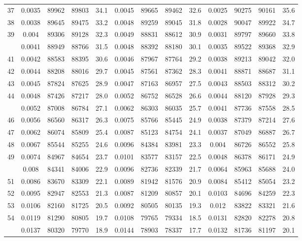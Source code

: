 \documentclass[
  14pt,
]{article}
\begin{document}
\begin{longtable}[t]{lcccccccccccc}
37 & 0.0035 & 89962 & 89803 & 34.1 & 0.0045 & 89665 & 89462 & 32.6 & 0.0025 & 90275 & 90161 & 35.6\\
38 & 0.0038 & 89645 & 89475 & 33.2 & 0.0048 & 89259 & 89045 & 31.8 & 0.0028 & 90047 & 89922 & 34.7\\
39 & 0.004 & 89306 & 89128 & 32.3 & 0.0049 & 88831 & 88612 & 30.9 & 0.0031 & 89797 & 89660 & 33.8\\
\addlinespace
40 & 0.0041 & 88949 & 88766 & 31.5 & 0.0048 & 88392 & 88180 & 30.1 & 0.0035 & 89522 & 89368 & 32.9\\
41 & 0.0042 & 88583 & 88395 & 30.6 & 0.0046 & 87967 & 87764 & 29.2 & 0.0038 & 89213 & 89042 & 32.0\\
42 & 0.0044 & 88208 & 88016 & 29.7 & 0.0045 & 87561 & 87362 & 28.3 & 0.0041 & 88871 & 88687 & 31.1\\
43 & 0.0045 & 87824 & 87625 & 28.9 & 0.0047 & 87163 & 86957 & 27.5 & 0.0043 & 88503 & 88312 & 30.2\\
44 & 0.0048 & 87426 & 87217 & 28.0 & 0.0052 & 86752 & 86528 & 26.6 & 0.0044 & 88120 & 87928 & 29.3\\
\addlinespace
45 & 0.0052 & 87008 & 86784 & 27.1 & 0.0062 & 86303 & 86035 & 25.7 & 0.0041 & 87736 & 87558 & 28.5\\
46 & 0.0056 & 86560 & 86317 & 26.3 & 0.0075 & 85766 & 85445 & 24.9 & 0.0038 & 87379 & 87214 & 27.6\\
47 & 0.0062 & 86074 & 85809 & 25.4 & 0.0087 & 85123 & 84754 & 24.1 & 0.0037 & 87049 & 86887 & 26.7\\
48 & 0.0067 & 85544 & 85255 & 24.6 & 0.0096 & 84384 & 83981 & 23.3 & 0.004 & 86726 & 86552 & 25.8\\
49 & 0.0074 & 84967 & 84654 & 23.7 & 0.0101 & 83577 & 83157 & 22.5 & 0.0048 & 86378 & 86171 & 24.9\\
\addlinespace
50 & 0.008 & 84341 & 84006 & 22.9 & 0.0096 & 82736 & 82339 & 21.7 & 0.0064 & 85963 & 85688 & 24.0\\
51 & 0.0086 & 83670 & 83309 & 22.1 & 0.0089 & 81942 & 81576 & 20.9 & 0.0084 & 85412 & 85054 & 23.2\\
52 & 0.0095 & 82947 & 82553 & 21.3 & 0.0087 & 81209 & 80857 & 20.1 & 0.0103 & 84696 & 84259 & 22.3\\
53 & 0.0106 & 82160 & 81725 & 20.5 & 0.0092 & 80505 & 80135 & 19.3 & 0.012 & 83822 & 83321 & 21.6\\
54 & 0.0119 & 81290 & 80805 & 19.7 & 0.0108 & 79765 & 79334 & 18.5 & 0.0131 & 82820 & 82278 & 20.8\\
\addlinespace
55 & 0.0137 & 80320 & 79770 & 18.9 & 0.0144 & 78903 & 78337 & 17.7 & 0.0132 & 81736 & 81197 & 20.1\\

\end{longtable}
\end{document}
